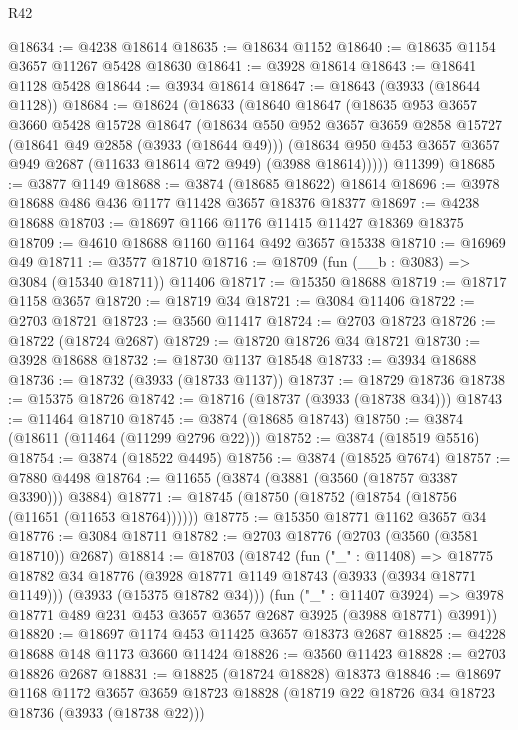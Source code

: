 \begin{lexlean}{R42}
\begin{coremodule}
@18634 := @4238 @18614
@18635 := @18634 @1152
@18640 := @18635 @1154 @3657 @11267 @5428 @18630
@18641 := @3928 @18614
@18643 := @18641 @1128 @5428
@18644 := @3934 @18614
@18647 := @18643 (@3933 (@18644 @1128))
@18684 := @18624
    (@18633
      (@18640
        @18647
        (@18635
          @953
          @3657
          @3660
          @5428
          @15728
          @18647
          (@18634
            @550
            @952
            @3657
            @3659
            @2858
            @15727
            (@18641 @49 @2858 (@3933 (@18644 @49)))
            (@18634 @950 @453 @3657 @3657 @949 @2687 (@11633 @18614 @72 @949) (@3988 @18614)))))
      @11399)
@18685 := @3877 @1149
@18688 := @3874 (@18685 @18622) @18614
@18696 := @3978 @18688 @486 @436 @1177 @11428 @3657 @18376 @18377
@18697 := @4238 @18688
@18703 := @18697 @1166 @1176 @11415 @11427 @18369 @18375
@18709 := @4610 @18688 @1160 @1164 @492 @3657 @15338
@18710 := @16969 @49
@18711 := @3577 @18710
@18716 := @18709 (fun (__b : @3083) => @3084 (@15340 @18711)) @11406
@18717 := @15350 @18688
@18719 := @18717 @1158 @3657
@18720 := @18719 @34
@18721 := @3084 @11406
@18722 := @2703 @18721
@18723 := @3560 @11417
@18724 := @2703 @18723
@18726 := @18722 (@18724 @2687)
@18729 := @18720 @18726 @34 @18721
@18730 := @3928 @18688
@18732 := @18730 @1137 @18548
@18733 := @3934 @18688
@18736 := @18732 (@3933 (@18733 @1137))
@18737 := @18729 @18736
@18738 := @15375 @18726
@18742 := @18716 (@18737 (@3933 (@18738 @34)))
@18743 := @11464 @18710
@18745 := @3874 (@18685 @18743)
@18750 := @3874 (@18611 (@11464 (@11299 @2796 @22)))
@18752 := @3874 (@18519 @5516)
@18754 := @3874 (@18522 @4495)
@18756 := @3874 (@18525 @7674)
@18757 := @7880 @4498
@18764 := @11655 (@3874 (@3881 (@3560 (@18757 @3387 @3390))) @3884)
@18771 := @18745 (@18750 (@18752 (@18754 (@18756 (@11651 (@11653 @18764))))))
@18775 := @15350 @18771 @1162 @3657 @34
@18776 := @3084 @18711
@18782 := @2703 @18776 (@2703 (@3560 (@3581 @18710)) @2687)
@18814 := @18703
    (@18742
      (fun ("_" : @11408) =>
      @18775
        @18782
        @34
        @18776
        (@3928 @18771 @1149 @18743 (@3933 (@3934 @18771 @1149)))
        (@3933 (@15375 @18782 @34)))
      (fun ("_" : @11407 @3924) =>
      @3978 @18771 @489 @231 @453 @3657 @3657 @2687 @3925 (@3988 @18771) @3991))
@18820 := @18697 @1174 @453 @11425 @3657 @18373 @2687
@18825 := @4228 @18688 @148 @1173 @3660 @11424
@18826 := @3560 @11423
@18828 := @2703 @18826 @2687
@18831 := @18825 (@18724 @18828) @18373
@18846 := @18697
    @1168
    @1172
    @3657
    @3659
    @18723
    @18828
    (@18719 @22 @18726 @34 @18723 @18736 (@3933 (@18738 @22)))

\end{coremodule}
\end{lexlean}

